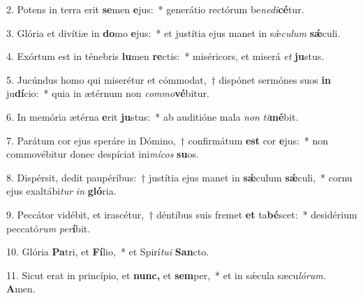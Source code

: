 \item 2. Potens in terra erit \textbf{se}men \textbf{e}jus:~* generátio rectórum be\textit{nedi}\textbf{cé}tur.
\item 3. Glória et divítiæ in \textbf{do}mo \textbf{e}jus:~* et justítia ejus manet in sǽ\textit{culum} \textbf{sǽ}culi.
\item 4. Exórtum est in ténebris \textbf{lu}men \textbf{re}ctis:~* miséricors, et miserá\hspace{0.03emtor,} \textit{et} \textbf{ju}stus.
\item 5. Jucúndus homo qui miserétur et cómmodat,~† dispónet sermónes suos \textbf{in} ju\textbf{dí}cio:~* quia in ætérnum non \textit{commo}\textbf{vé}bitur.
\item 6. In memória ætérna \textbf{e}rit \textbf{ju}stus:~* ab auditióne mala \textit{non} \textit{ti}\textbf{mé}bit.
\item 7. Parátum cor ejus speráre in Dómino,~† confirmátum \textbf{est} cor \textbf{e}jus:~* non commovébitur donec despíciat ini\textit{mícos} \textbf{su}os.
\item 8. Dispérsit, dedit paupéribus:~† justítia ejus manet in \textbf{sǽ}culum \textbf{sǽ}culi,~* cornu ejus exaltábi\textit{tur} \textit{in} \textbf{gló}ria.
\item 9. Peccátor vidébit, et irascétur,~† déntibus suis fremet \textbf{et} ta\textbf{bé}scet:~* desidérium peccató\textit{rum} \textit{per}\textbf{í}bit.
\item 10. Glória \textbf{Pa}tri, et \textbf{Fí}lio,~* et Spirí\textit{tui} \textbf{San}cto.
\item 11. Sicut erat in princípio, et \textbf{nunc,} et \textbf{sem}per,~* et in sǽcula sæcu\hspace{0.03em}\textit{lórum.} \textbf{A}men.